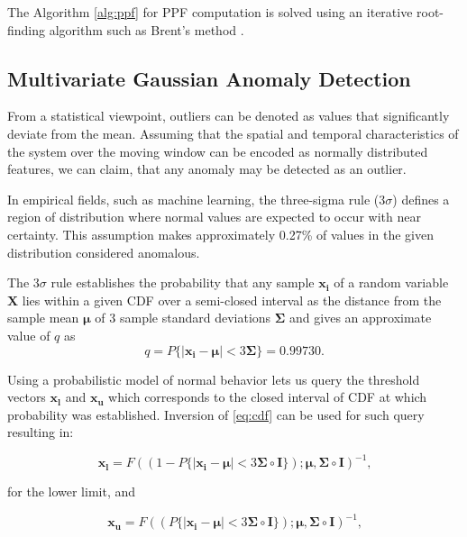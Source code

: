 The Algorithm \ref{alg:ppf} for PPF computation is solved using an iterative root-finding algorithm such as Brent's method \cite{Brent72}.

\subsection{Multivariate Gaussian Anomaly Detection}\label{AA:Anomaly}
From a statistical viewpoint, outliers can be denoted
as values that significantly deviate from the mean. Assuming that the spatial and temporal characteristics of the system over the moving window can be encoded as normally distributed features, we can claim, that any anomaly may be detected as an outlier.

In empirical fields, such as machine learning, the three-sigma rule ($3\sigma$) defines a region of distribution where normal values are expected to occur with near certainty. This assumption makes approximately 0.27\% of values in the given distribution considered anomalous.

The \(3\sigma\) rule establishes the probability that any sample \(\boldsymbol{x_i}\) of a random variable \(\boldsymbol{X}\) lies within a given CDF over a semi-closed interval as the distance from the sample mean \(\boldsymbol{\mu}\) of 3 sample standard deviations \(\boldsymbol{\Sigma}\) and gives an approximate value of $q$ as
\begin{equation}
q=P\{|\boldsymbol{x_i}-\boldsymbol{\mu}|<3\boldsymbol{\Sigma}\}=0.99730\text{.}
\end{equation}

Using a probabilistic model of normal behavior lets us query the threshold vectors \(\boldsymbol{x_{l}}\) and \(\boldsymbol{x_{u}}\) which corresponds to the closed interval of CDF at which probability was established. Inversion of \eqref{eq:cdf} can be used for such query resulting in:

\begin{equation}
\boldsymbol{x_l} = F((1 - P\{|\boldsymbol{x_i}-\boldsymbol{\mu}|<3\boldsymbol{\Sigma}\circ\boldsymbol{I}\}); \boldsymbol{\mu}, \boldsymbol{\Sigma}\circ\boldsymbol{I})^{-1}\text{,}\label{eq:thresh_low}
\end{equation}

for the lower limit, and

\begin{equation}
\boldsymbol{x_u} = F((P\{|\boldsymbol{x_i}-\boldsymbol{\mu}|<3\boldsymbol{\Sigma}\circ\boldsymbol{I}\}); \boldsymbol{\mu}, \boldsymbol{\Sigma}\circ\boldsymbol{I})^{-1}\text{,}\label{eq:thresh_high}
\end{equation}

